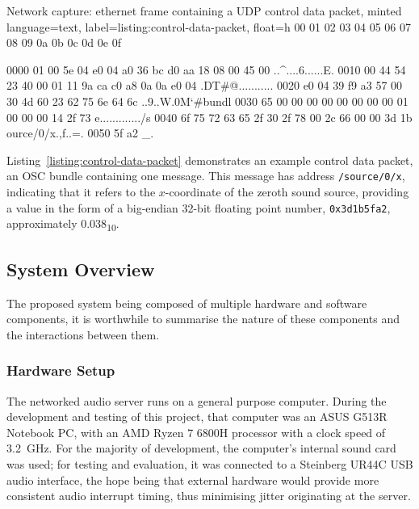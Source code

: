 \documentclass[utf8]{FrontiersinHarvard}
\newcommand{\lstref}[1]{Listing~\ref{#1}}
\newcommand{\numDec}[1]{\num{#1}\textsubscript{10}}
\begin{document}
    \begin{codelisting}{
        Network capture: ethernet frame containing a UDP control data packet,
        minted language=text,
        label=listing:control-data-packet,
        float=h
    }
       00 01 02 03 04 05 06 07  08 09 0a 0b 0c 0d 0e 0f

0000   01 00 5e 04 e0 04 a0 36  bc d0 aa 18 08 00 45 00   ..^....6......E.
0010   00 44 54 23 40 00 01 11  9a ca c0 a8 0a 0a e0 04   .DT#@...........
0020   e0 04 39 f9 a3 57 00 30  4d 60 23 62 75 6e 64 6c   ..9..W.0M`#bundl
0030   65 00 00 00 00 00 00 00  00 01 00 00 00 14 2f 73   e............./s
0040   6f 75 72 63 65 2f 30 2f  78 00 2c 66 00 00 3d 1b   ource/0/x.,f..=.
0050   5f a2                                              _.
    \end{codelisting}

    \lstref{listing:control-data-packet} demonstrates an example control data
    packet, an OSC bundle containing one message.
    This message has address \texttt{/source/0/x}, indicating that it refers to the
    $x$-coordinate of the zeroth sound source, providing a value in the form of a
    big-endian 32-bit floating point number, \texttt{0x3d1b5fa2}, approximately
    \numDec{0.038}.

    \subsection{System Overview}\label{subsec:system-overview}

    The proposed system being composed of multiple hardware and software components,
    it is worthwhile to summarise the nature of these components and the
    interactions between them.

    \subsubsection{Hardware Setup}

    The networked audio server runs on a general purpose computer.
    During the development and testing of this project, that computer was an ASUS
    G513R Notebook PC, with an AMD Ryzen 7 6800H processor with a clock
    speed of \qty{3.2}{\GHz}.
    For the majority of development, the computer's internal sound card was used;
    for testing and evaluation, it was connected to a Steinberg UR44C USB audio
    interface, the hope being that external hardware would provide more consistent
    audio interrupt timing, thus minimising jitter originating at the server.
\end{document}
